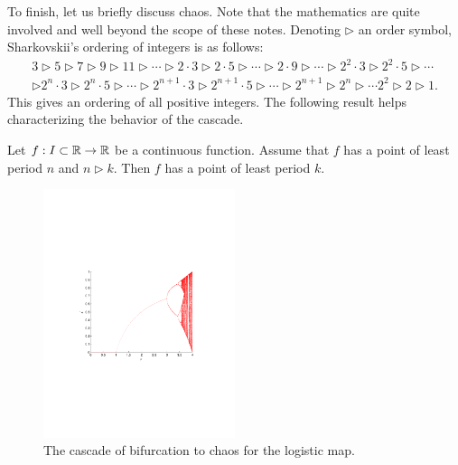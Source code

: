 To finish, let us briefly discuss chaos. Note that the mathematics are quite involved and well beyond the scope of these notes.
Denoting $\triangleright$ an order symbol, Sharkovskii's ordering of integers is as follows:
\begin{gather*}
3\triangleright 5\triangleright 7 \triangleright 9 \triangleright 11\triangleright \cdots \triangleright 2\cdot 3\triangleright  2\cdot 5\triangleright \cdots \triangleright 2\cdot 9\triangleright\cdots\triangleright 2^2\cdot 3\triangleright 2^2\cdot 5\triangleright \cdots \\
\triangleright 2^n\cdot 3\triangleright 2^n\cdot 5\triangleright \cdots\triangleright 2^{n+1}\cdot 3\triangleright 2^{n+1}\cdot 5\triangleright \cdots
\triangleright 2^{n+1}\triangleright 2^n\triangleright \cdots 2^2 \triangleright 2\triangleright 1.
\end{gather*}
This gives an ordering of all positive integers. The following result helps characterizing the behavior of the cascade.
\begin{theorem}[Sharkovskii]\label{th:sharkovskii}
Let $f:I\subset\mathbb{R}\to\mathbb{R}$ be a continuous function. Assume that $f$ has a point of least period $n$ and $n\triangleright k$. Then $f$ has a point of least period $k$.
\end{theorem}


\begin{figure}[htbp]
\begin{center}
\includegraphics[width=0.5\textwidth]
{../figs_02_population_growth/analysis_logistic_cascade_full}
\end{center}
\caption{The cascade of bifurcation to chaos for the logistic map.}
\end{figure}

